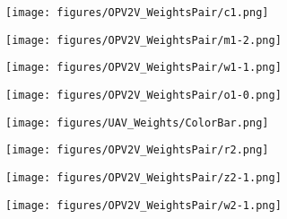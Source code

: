 \documentclass{article}
\begin{document}
\begin{figure}[!t]

  \centering
    \begin{subfigure}{0.22\linewidth}
    \texttt{[image: figures/OPV2V\_WeightsPair/c1.png]}
    \vspace{-5mm}
    \caption{}
    \label{fig:UAV_ConfMap1}
  \end{subfigure}
\begin{subfigure}{0.22\linewidth}
    \texttt{[image: figures/OPV2V\_WeightsPair/m1-2.png]}
    \vspace{-5mm}
    \caption{}
    \label{fig:UAV_SelectMat1}
  \end{subfigure}
  \begin{subfigure}{0.22\linewidth}
    \texttt{[image: figures/OPV2V\_WeightsPair/w1-1.png]}
    \vspace{-5mm}
    \caption{}
    \label{fig:UAV_AttenWeight1to1}
  \end{subfigure}
  \begin{subfigure}{0.22\linewidth}
    \texttt{[image: figures/OPV2V\_WeightsPair/o1-0.png]}
    \vspace{-5mm}
    \caption{}
    \label{fig:UAV_Detections}
  \end{subfigure}
  \begin{subfigure}{0.07\linewidth}
    \texttt{[image: figures/UAV\_Weights/ColorBar.png]}
  \end{subfigure}
  \centering
  \begin{subfigure}{0.22\linewidth}
    \texttt{[image: figures/OPV2V\_WeightsPair/r2.png]}
    \vspace{-5mm}
    \caption{}
    \label{fig:UAV_RequestMap2}
  \end{subfigure}
\begin{subfigure}{0.22\linewidth}
    \texttt{[image: figures/OPV2V\_WeightsPair/z2-1.png]}
    \vspace{-5mm}
    \caption{}
    \label{fig:UAV_Message2}
  \end{subfigure}
  \begin{subfigure}{0.22\linewidth}
    \texttt{[image: figures/OPV2V\_WeightsPair/w2-1.png]}
    \vspace{-5mm}
    \caption{}
    \label{fig:UAV_AttenWeight2to1}
  \end{subfigure}
  \begin{subfigure}{0.22\linewidth}

\end{subfigure}
\end{figure}
\end{document}
